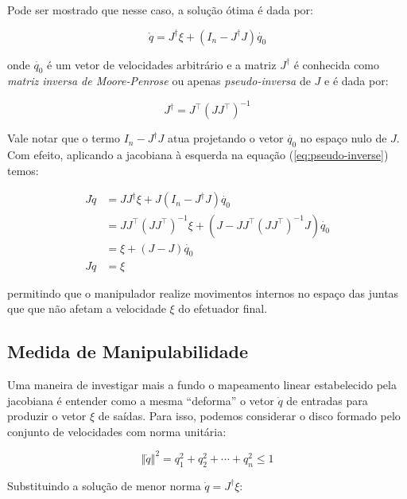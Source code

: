 Pode ser mostrado que nesse caso, a solução ótima é dada por:

\begin{equation}\label{eq:pseudo-inverse}
    \dot{q} = J^\dag \xi + (I_n - J^\dag J) \dot{q_0}
\end{equation}

onde \(\dot{q_0}\) é um vetor de velocidades arbitrário e a matriz \(J^\dag\) é
conhecida como \emph{matriz inversa de Moore-Penrose} ou apenas
\emph{pseudo-inversa} de \(J\) e é dada por:

\begin{equation}
    J^\dag = J^\top {(J J^\top)}^{-1}
\end{equation}

Vale notar que o termo \(I_n - J^\dag J\) atua projetando o vetor \(\dot{q_0}\)
no espaço nulo de \(J\). Com efeito, aplicando a jacobiana à esquerda na
equação (\ref{eq:pseudo-inverse}) temos:

\begin{align*}
    J \dot{q} & = J J^\dag \xi + J (I_n - J^\dag J) \dot{q_0}                                   \\
              & = J J^\top {(J J^\top)}^{-1} \xi + (J - J J^\top {(J J^\top)}^{-1} J) \dot{q_0} \\
              & = \xi + (J - J) \dot{q_0}                                                       \\
    J \dot{q} & = \xi
\end{align*}

permitindo que o manipulador realize movimentos internos no espaço das juntas
que que não afetam a velocidade \(\xi\) do efetuador final.

\subsection{Medida de Manipulabilidade}

Uma maneira de investigar mais a fundo o mapeamento linear estabelecido pela
jacobiana é entender como a mesma ``deforma'' o vetor \(\dot{q}\) de entradas
para produzir o vetor \(\xi\) de saídas. Para isso, podemos considerar o disco
formado pelo conjunto de velocidades com norma unitária:

\begin{equation}
    \left\Vert \dot{q} \right\Vert^2 = q_1^2 + q_2^2 + \cdots + q_n^2 \leq 1
\end{equation}

Substituindo a solução de menor norma \(\dot{q} = J^\dag \xi\):

